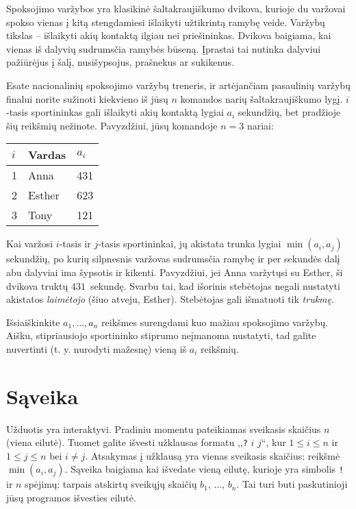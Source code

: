 

\noindent
Spoksojimo varžybos yra klasikinė šaltakraujiškumo dvikova, 
kurio\-je du varžovai spokso vienas į kitą stengdamiesi išlaikyti užtikrintą ramybę veide.
Varžybų tikslas -- išlaikyti akių kontaktą ilgiau nei priešininkas.
Dvikova baigiama, kai vienas iš dalyvių sudrums\-čia ramybės būseną. 
Įprastai tai nutinka dalyviui pažiūrėjus į šalį, nusišypsojus, prašnekus ar sukikenus.

Esate nacionalinių spoksojimo varžybų treneris, ir artėjančiam pasaulinių varžybų finalui
norite sužinoti kiekvieno iš jūsų $n$ komandos narių šaltakraujiškumo lygį.
$i$-tasis sportininkas gali išlaikyti akių kontaktą lygiai $a_i$ sekundžių, bet pradžioje šių reikšmių nežinote.
Pavyzdžiui, jūsų komandoje $n=3$ nariai:

\medskip
\begin{tabular}{lll}
  $i$ & Vardas & $a_i$\\\hline
  1 & Anna &  431 \\
  2 & Esther & 623 \\
  3 & Tony &  121\\
\end{tabular}

\medskip
Kai  varžosi $i$-tasis ir $j$-tasis sportininkai, jų akistata trunka lygiai $\min(a_i, a_j)$ sekundžių, 
po kurių silpnesnis varžovas sudrumsčia ramybę ir per sekundės dalį abu dalyviai ima šypsotis ir kikenti.
Pavyzdžiui, jei Anna varžytųsi su Esther, ši dvikova truktų $431$~sekundę.
Svarbu tai, kad išorinis stebėtojas negali nustatyti akistatos \emph{laimėtojo} (šiuo atveju, Esther).
Stebėtojas gali išmatuoti tik \emph{trukmę}.

Išsiaiškinkite $a_1,\ldots, a_n$ reikšmes surengdami kuo mažiau spoksojimo varžybų.
Aišku, stipriausiojo sportininko stiprumo neįmanoma nustatyti, tad galite nuvertinti (t. y. nurodyti mažesnę) vieną iš $a_i$ reikšmių.

\section*{Sąveika}

Užduotis yra interaktyvi.
Pradiniu momentu pateikiamas sveikasis skaičius $n$ (viena eilutė).
Tuomet galite išvesti užklausas formatu ,,\texttt{?} $i$ $j$``, kur $1\leq i\leq n$ ir $1\leq j\leq n$ bei $i\neq j$.
Atsakymas į užklausą yra vienas sveikasis skaičius: reikšmė $\min(a_i, a_j)$.
Sąveika baigiama kai išvedate vieną eilutę, kurioje yra simbolis \texttt{!} ir
$n$ spėjimų: tarpais atskirtų sveikųjų skaičių $b_1$, $\ldots$, $b_n$.  
Tai turi buti paskutinioji jūsų programos išvesties eilutė.

